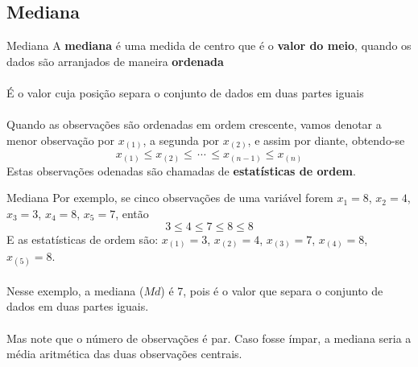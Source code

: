 \documentclass[10pt]{beamer}\usepackage[]{graphicx}\usepackage[]{color}
\theoremstyle{definition}
\begin{document}
\subsection{Mediana}

\begin{frame}{Mediana}
  A \textbf{mediana} é uma medida de centro que é o \textbf{valor do meio},
  quando os dados são arranjados de maneira \textbf{ordenada} \\~\\
  É o valor cuja posição separa o conjunto de dados em duas partes
  iguais\\~\\
  Quando as observações são ordenadas em ordem crescente, vamos denotar
  a menor observação por $x_{(1)}$, a segunda por $x_{(2)}$, e assim por
  diante, obtendo-se
  \begin{equation*}
    x_{(1)} \leq x_{(2)} \leq \, \cdots \, \leq x_{(n-1)} \leq x_{(n)}
  \end{equation*}
  Estas observações odenadas são chamadas de \textbf{estatísticas de
    ordem}.
\end{frame}

\begin{frame}{Mediana}
  Por exemplo, se cinco observações de uma variável forem $x_1 = 8$,
  $x_2 = 4$, $x_3 = 3$, $x_4 = 8$, $x_5 = 7$, então
  \begin{equation*}
    3 \leq 4 \leq 7 \leq 8 \leq 8
  \end{equation*}
  E as estatísticas de ordem são: $x_{(1)} = 3$, $x_{(2)} = 4$, $x_{(3)}
  = 7$, $x_{(4)} = 8$, $x_{(5)} = 8$. \\~\\
  Nesse exemplo, a mediana ($Md$) é 7, pois é o valor que separa o
  conjunto de dados em duas partes iguais. \\~\\
  Mas note que o número de observações é par. Caso fosse ímpar, a
  mediana seria a média aritmética das duas observações centrais.
\end{frame}
\end{document}

